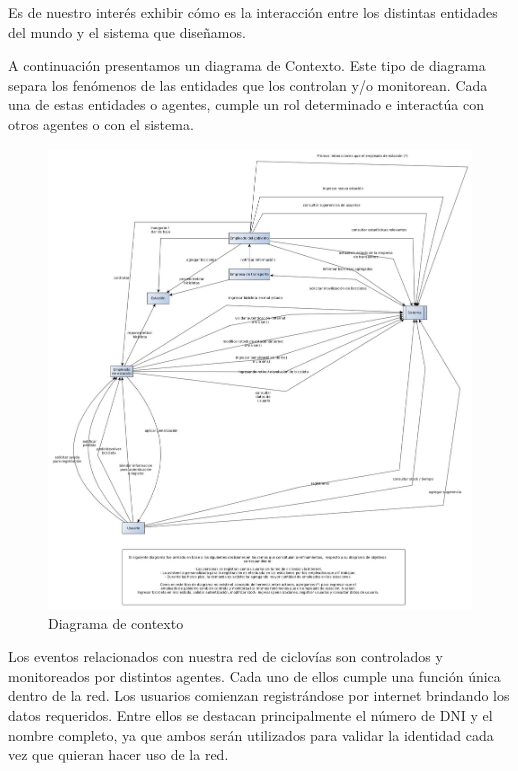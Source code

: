 
Es de nuestro interés exhibir cómo es la interacción entre los distintas entidades del mundo y el sistema que diseñamos.

A continuación presentamos un diagrama de Contexto. Este tipo de diagrama separa los fenómenos de las entidades que los controlan y/o monitorean. Cada una de estas entidades o agentes, cumple un rol determinado e interactúa con otros agentes o con el sistema.

\begin{figure}[H]
	\begin{center}
		  \includegraphics[scale=0.35]{diagrama_contexto.jpg}
		  \caption{Diagrama de contexto}
		  \label{fig:contra1}
	\end{center}
\end{figure}

Los eventos relacionados con nuestra red de ciclovías son controlados y monitoreados por distintos agentes. Cada uno de ellos cumple una función única dentro de la red.
Los usuarios comienzan registrándose por internet brindando los datos requeridos. Entre ellos se destacan principalmente el número de DNI y el nombre completo, ya que ambos serán utilizados
para validar la identidad cada vez que quieran hacer uso de la red. 

